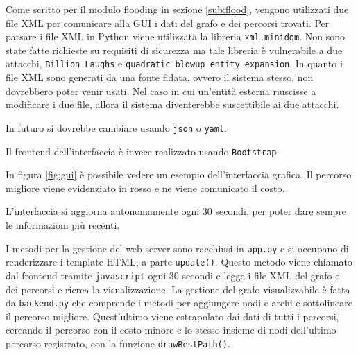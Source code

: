  Come scritto per il modulo flooding in sezione \ref{sub:flood}, vengono utilizzati due file XML per comunicare alla GUI i dati del grafo e dei percorsi trovati.
 Per parsare i file XML in Python viene utilizzata la libreria \texttt{xml.minidom}. Non sono state fatte richieste su requisiti di sicurezza ma tale libreria è vulnerabile
 a due attacchi, \texttt{Billion Laughs} \cite{BillionLaughs} e \texttt{quadratic blowup entity expansion}. In quanto i file XML sono generati da una fonte fidata, ovvero il
 sistema stesso, non dovrebbero poter venir usati. Nel caso in cui un'entità esterna riuscisse a modificare i due file, allora il sistema diventerebbe suscettibile ai due attacchi.

 In futuro si dovrebbe cambiare usando \texttt{json} o \texttt{yaml}.

 Il frontend dell'interfaccia è invece realizzato usando \texttt{Bootstrap}.

 In figura \ref{fig:gui} è possibile vedere un esempio dell'interfaccia grafica. Il percorso migliore viene evidenziato in rosso e ne viene comunicato il costo.

 L'interfaccia si aggiorna autonomamente ogni 30 secondi, per poter dare sempre le informazioni più recenti.

 I metodi per la gestione del web server sono racchiusi in \texttt{app.py} e si occupano di renderizzare
 i template HTML, a parte \texttt{update()}. Questo metodo viene chiamato dal frontend tramite \texttt{javascript} ogni 30 secondi
 e legge i file XML del grafo e dei percorsi e ricrea la visualizzazione.
 La gestione del grafo visualizzabile è fatta da \texttt{backend.py} che comprende i metodi per aggiungere 
 nodi e archi e sottolineare il percorso migliore. Quest'ultimo viene estrapolato dai dati di tutti i percorsi,
 cercando il percorso con il costo minore e lo stesso insieme di nodi dell'ultimo percorso registrato, con la funzione
 \texttt{drawBestPath()}.
